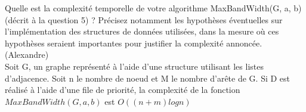 Quelle est la complexité temporelle de votre algorithme MaxBandWidth(G, a, b)
(décrit à la question 5) ? Précisez notamment les hypothèses éventuelles sur l’implémentation
des structures de données utilisées, dans la mesure où ces hypothèses
seraient importantes pour justifier la complexité annoncée.%
(Alexandre)\\
Soit G, un graphe représenté à l'aide d'une structure utilisant les listes d'adjacence. Soit n le nombre de noeud et M le nombre d'arête de G.
Si D est réalisé à l'aide d'une file de priorité, la complexité de la fonction $MaxBandWidth(G, a, b)$ est $O((n+m)log n)$